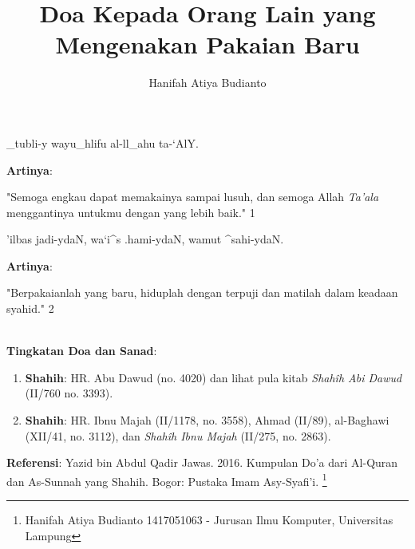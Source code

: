 \documentclass[a4paper,12pt]{article}
\title{\Large Doa Kepada Orang Lain yang Mengenakan Pakaian Baru}
\author{\calligra Hanifah Atiya Budianto}
\begin{document}
\sffamily
\maketitle 
\fullvocalize
{}
\begin{arabtext}
\noindent
_tubli-y wayu_hlifu al-ll_ahu ta-`AlY.\\
\end{arabtext}
\noindent
\textbf{Artinya}:
\par
\indent
"Semoga engkau dapat memakainya sampai lusuh, dan semoga Allah
\textit{Ta'ala} menggantinya untukmu dengan yang lebih baik." 
{\scriptsize 1}\\
\begin{arabtext}
\noindent
'ilbas jadi-ydaN, wa`i^s .hami-ydaN, wamut ^sahi-ydaN.\\
\end{arabtext}
\noindent
\textbf{Artinya}:
\par
\indent
"Berpakaianlah yang baru, hiduplah dengan terpuji dan matilah dalam keadaan
syahid." {\scriptsize 2}\\\\
\par
\noindent
\textbf{Tingkatan Doa dan Sanad}:
\begin{enumerate}
\item \textbf{Shahih}: HR. Abu Dawud (no. 4020) dan lihat pula kitab
\textit{Shah\^{i}h Abi Dawud} (II/760 no. 3393).
\item \textbf{Shahih}: HR. Ibnu Majah (II/1178, no. 3558), Ahmad (II/89), 
al-Baghawi (XII/41, no. 3112), dan \textit{Shah\^{i}h Ibnu Majah} (II/275, 
no. 2863).
\end{enumerate}
\textbf{Referensi}: Yazid bin Abdul Qadir Jawas. 2016. Kumpulan Do'a dari
Al-Quran dan As-Sunnah yang Shahih. Bogor: Pustaka Imam Asy-Syafi'i.
\footnote{Hanifah Atiya Budianto 1417051063 - Jurusan Ilmu Komputer,
Universitas Lampung}
\end{document}
